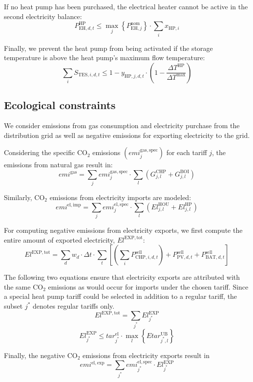 If no heat pump has been purchased, the electrical heater cannot be active in the second electricity balance:
\begin{equation}
	P^\mathrm{HP}_{\mathrm{EH,}d,t} \le \max_j\left\lbrace P^\mathrm{nom}_{\mathrm{EH},j} \right\rbrace \cdot \sum\limits_{i}x_{\mathrm{HP,}i}
\end{equation}

Finally, we prevent the heat pump from being activated if the storage temperature is above the heat pump's maximum flow temperature:
\begin{equation}
	\sum\limits_{i} S_{\mathrm{TES,}i,d,t} \le 1 - y_{\mathrm{HP,}j,d,t} \cdot \left( 1 - \dfrac{\Delta T^\mathrm{HP}}{\Delta T^\mathrm{max}} \right)
\end{equation}


\subsection{Ecological constraints}
We consider emissions from gas consumption and electricity purchase from the distribution grid as well as negative emissions for exporting electricity to the grid.

Considering the specific CO$_2$ emissions $\left(emi^\mathrm{gas,spec}_{j}\right)$ for each tariff $j$, the emissions from natural gas result in:
\begin{equation}
	emi^\mathrm{gas} = \sum\limits_{j} emi^\mathrm{gas,spec}_{j} \cdot \sum\limits_{l}  \left(G^\mathrm{CHP}_{j,l} + G^\mathrm{BOI}_{j,l}\right)
\end{equation}

Similarly, CO$_2$ emissions from electricity imports are modeled:
\begin{equation}
	emi^\mathrm{el,imp} = \sum\limits_{j} emi^\mathrm{el,spec}_{j} \cdot \sum\limits_{l} \left(El^\mathrm{HOU}_{j,l} + El^\mathrm{HP}_{j,l}\right)
\end{equation}

For computing negative emissions from electricity exports, we first compute the entire amount of exported electricity, $El^\mathrm{EXP,tot}$:
\begin{equation}
	El^\mathrm{EXP,tot} = \sum\limits_{d} w_d \cdot \Delta t \cdot \sum\limits_{t} \left[ \left( \sum\limits_{i} P_{\mathrm{CHP,}i,d,t}^\mathrm{sell} \right) + P_{\mathrm{PV},d,t}^\mathrm{sell} + P_{\mathrm{BAT,}d,t}^\mathrm{sell} \right]
\end{equation}

The following two equations ensure that electricity exports are attributed with the same CO$_2$ emissions as would occur for imports under the chosen tariff.
Since a special heat pump tariff could be selected in addition to a regular tariff, the subset $j^*$ denotes regular tariffs only.
\begin{equation}
	El^\mathrm{EXP,tot} = \sum\limits_{j^*} El^\mathrm{EXP}_{j^*}
\end{equation}
\begin{equation}
	El^\mathrm{EXP}_{j^*} \le tar_{j^*}^\mathrm{el} \cdot \max_l \left\lbrace Etar^\mathrm{UB}_{j^*,l} \right\rbrace
\end{equation}

Finally, the negative CO$_2$ emissions from electricity exports result in
\begin{equation}
	emi^\mathrm{el,exp} = \sum\limits_{j^*} emi^\mathrm{el,spec}_{j^*} \cdot El^\mathrm{EXP}_{j^*}
\end{equation}
